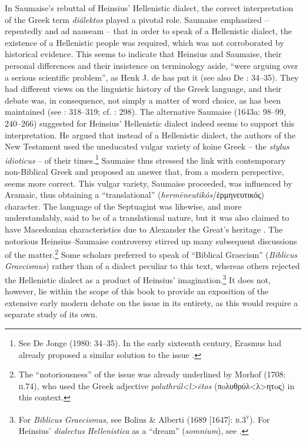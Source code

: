 In Saumaise’s rebuttal of Heinsius’ Hellenistic dialect, the correct interpretation of the Greek term \textit{diálektos} played a pivotal role. Saumaise emphasized – repeatedly and ad nauseam – that in order to speak of a Hellenistic dialect, the existence of a Hellenistic people was required, which was not corroborated by historical evidence. This seems to indicate that Heinsius and Saumaise, their personal differences and their insistence on terminology aside, “were arguing over a serious scientific problem”, as Henk J. de \citet[117]{Jonge1981} has put it (see also De \citealt{Jonge1980}: 34–35). They had different views on the linguistic history of the Greek language, and their debate was, in consequence, not simply a matter of word choice, as has been maintained (see \citealt{Simon1689}: 318–319; cf. \citealt{Considine2012}: 298). The alternative Saumaise (1643a: 98–99, 240–266) suggested for Heinsius’ Hellenistic dialect indeed seems to support this interpretation. He argued that instead of a Hellenistic dialect, the authors of the New Testament used the uneducated vulgar variety of koine Greek – the \textit{stylus} \textit{idioticus} – of their times.\footnote{See De Jonge (1980: 34–35). In the early sixteenth century, Erasmus had already proposed a similar solution to the issue \citep[181]{Bentley1983}.} Saumaise thus stressed the link with contemporary non-Biblical Greek and proposed an answer that, from a modern perspective, seems more correct. This vulgar variety, Saumaise proceeded, was influenced by Aramaic, thus obtaining a “translational” (\textit{hermēneutikós}/ἑρμηνευτικός) character. The language of the Septuagint was likewise, and more understandably, said to be of a translational nature, but it was also claimed to have Macedonian characteristics due to Alexander the Great’s heritage \citep[264]{Saumaise1643a}. The notorious Heinsius–Saumaise controversy stirred up many subsequent discussions of the matter.\footnote{The “notoriousness” of the issue was already underlined by Morhof (1708: \textsc{ii.}74), who used the Greek adjective \textit{poluthrúl<l>ētos}  (πoλυθρύλ<λ>ητoς) in this context.} Some scholars preferred to speak of “Biblical Graecism” (\textit{Biblicus} \textit{Graecismus}) rather than of a dialect peculiar to this text, whereas others rejected the Hellenistic dialect as a product of Heinsius’ imagination.\footnote{For \textit{Biblicus} \textit{Graecismus}, see Bolius \& Alberti (1689 [1647]: \textsc{b.3}\textsc{\textsuperscript{v}}). For Heinsius’ \textit{dialectus} \textit{Hellenistica} as a “dream” (\textit{somnium}), see \citet{Croy1644}.} It does not, however, lie within the scope of this book to provide an exposition of the extensive early modern debate on the issue in its entirety, as this would require a separate study of its own.


